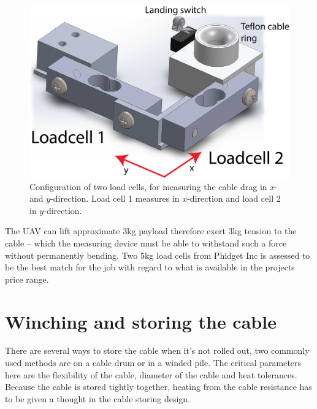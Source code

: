 \begin{figure}[hbtp]
\centering
\includegraphics[scale=0.75]{graphics/cad/loadcell.png}
\caption[Configuration of two load cells, for measuring the cable drag]{Configuration of two load cells, for measuring the cable drag in $x$- and $y$-direction. Load cell 1 measures in $x$-direction and load cell 2 in $y$-direction.}
\label{fig:loadcells}
\end{figure}

\noindent
The UAV can lift approximate 3kg payload therefore exert 3kg tension to the cable -- which the measuring device must be able to withstand such a force without permanently bending. Two 5kg load cells from Phidget Inc is assessed to be the best match for the job with regard to what is available in the projects price range.








\section{Winching and storing the cable}
There are several ways to store the cable when it's not rolled out, two commonly used methods are on a cable drum or in a winded pile. The critical parameters here are the flexibility of the cable, diameter of the cable and heat tolerances.  Because the cable is stored tightly together, heating from the cable resistance has to be given a thought in the cable storing design.

